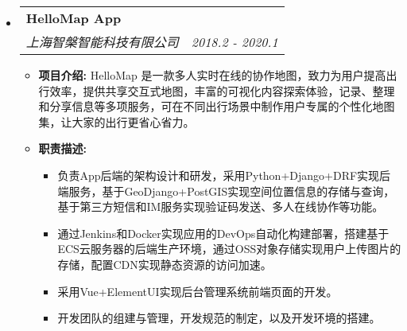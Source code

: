 \documentclass[letterpaper,11pt]{article}
\makeatletter
\newcommand{\resitem}[1]{\item #1 \vspace{-2pt}}
\newcommand{\ressubheading}[4]{
\begin{tabular*}{6.5in}{l@{\cftdotfill{\cftsecdotsep}\extracolsep{\fill}}r}
\textbf{#1} & #2 \\
\textit{#3} & \textit{#4} \\
\end{tabular*}\vspace{-6pt}}
\makeatother
\begin{document}
\begin{itemize}
  \item
  \ressubheading{HelloMap App}{}{上海智槃智能科技有限公司}{2018.2 - 2020.1}
  \begin{itemize}
    \resitem{ {\bf 项目介绍:} HelloMap 是一款多人实时在线的协作地图，致力为用户提高出行效率，提供共享交互式地图，丰富的可视化内容探索体验，记录、整理和分享信息等多项服务，可在不同出行场景中制作用户专属的个性化地图集，让大家的出行更省心省力。} %
    \resitem{ {\bf 职责描述:}
      \begin{itemize}
        \item 负责App后端的架构设计和研发，采用Python+Django+DRF实现后端服务，基于GeoDjango+PostGIS实现空间位置信息的存储与查询，基于第三方短信和IM服务实现验证码发送、多人在线协作等功能。
        \item 通过Jenkins和Docker实现应用的DevOps自动化构建部署，搭建基于ECS云服务器的后端生产环境，通过OSS对象存储实现用户上传图片的存储，配置CDN实现静态资源的访问加速。
        \item 采用Vue+ElementUI实现后台管理系统前端页面的开发。
        \item 开发团队的组建与管理，开发规范的制定，以及开发环境的搭建。
      \end{itemize}
    }
  \end{itemize}


\end{itemize}
\end{document}
